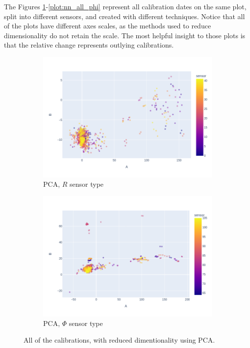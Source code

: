   The Figures \ref{plot:pca_all_r}-\ref{plot:nn_all_phi} represent all calibration dates on the same plot, split into different sensors, and created with different techniques. Notice that all of the plots have different axes scales, as the methods used to reduce dimensionality do not retain the scale. The most helpful insight to those plots is that the relative change represents outlying calibrations.

\begin{figure}
\centering
\begin{subfigure}[b]{0.9\textwidth}
    \centering
    \includegraphics[width=\linewidth]{figures/chapter4/dimred/PCA_module_R_all.png}
\caption{PCA, $R$ sensor type}
   \label{plot:pca_all_r}
  \end{subfigure}
\begin{subfigure}[b]{0.9\textwidth}
    \centering
    \includegraphics[width=\linewidth]{figures/chapter4/dimred/PCA_module_phi_all.png}
\caption{PCA, $\Phi$ sensor type}
   \label{plot:pca_all_phi}
  \end{subfigure}

    \caption[All calibrationa]{All of the calibrations, with reduced dimentionality using PCA.}
\end{figure}

